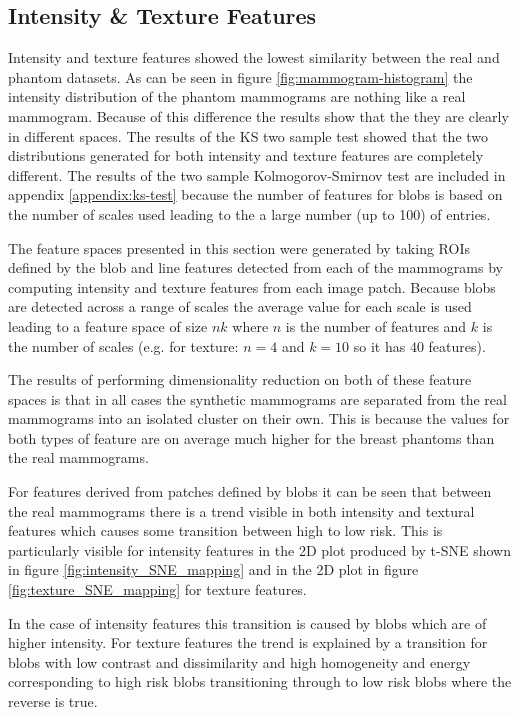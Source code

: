 \subsection{Intensity \& Texture Features}
\label{subsec:results-texture}
Intensity and texture features showed the lowest similarity between the real and phantom datasets. As can be seen in figure \ref{fig:mammogram-histogram} the intensity distribution of the phantom mammograms are nothing like a real mammogram. Because of this difference the results show that the they are clearly in different spaces. The results of the KS two sample test showed that the two distributions generated for both intensity and texture features are completely different. The results of the two sample Kolmogorov-Smirnov test are included in appendix \ref{appendix:ks-test} because the number of features for blobs is based on the number of scales used leading to the a large number (up to 100) of entries. 

The feature spaces presented in this section were generated by taking ROIs defined by the blob and line features detected from each of the mammograms by computing intensity and texture features from each image patch. Because blobs are detected across a range of scales the average value for each scale is used leading to a feature space of size $nk$ where $n$ is the number of features and $k$ is the number of scales (e.g. for texture: $n = 4$ and $k = 10$ so it has $40$ features). 

The results of performing dimensionality reduction on both of these feature spaces is that in all cases the synthetic mammograms are separated from the real mammograms into an isolated cluster on their own. This is because the values for both types of feature are on average much higher for the breast phantoms than the real mammograms.

For features derived from patches defined by blobs it can be seen that between the real mammograms there is a trend visible in both intensity and textural features which causes some transition between high to low risk. This is particularly visible for intensity features in the 2D plot produced by t-SNE shown in figure \ref{fig:intensity_SNE_mapping} and in the 2D plot in figure \ref{fig:texture_SNE_mapping} for texture features. 

In the case of intensity features this transition is caused by blobs which are of higher intensity. For texture features the trend is explained by a transition for blobs with low contrast and dissimilarity and high homogeneity and energy corresponding to high risk blobs transitioning through to low risk blobs where the reverse is true.

